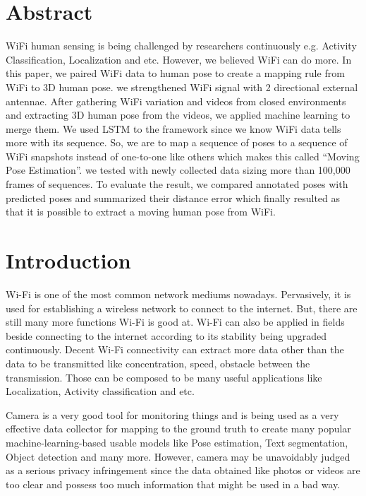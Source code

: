 \documentclass[10pt,letterpaper]{article}
\begin{document}
	\section*{Abstract}
	WiFi human sensing is being challenged by researchers continuously e.g. Activity Classification, Localization and etc. However, we believed WiFi can do more. In this paper, we paired WiFi data to human pose to create a mapping rule from WiFi to 3D human pose. we strengthened WiFi signal with 2 directional external antennae. After gathering WiFi variation and videos from closed environments and extracting 3D human pose from the videos, we applied machine learning to merge them. We used LSTM to the framework since we know WiFi data tells more with its sequence. So, we are to map a sequence of poses to a sequence of WiFi snapshots instead of one-to-one like others which makes this called ``Moving Pose Estimation''. we tested with newly collected data sizing more than 100,000 frames of sequences. To evaluate the result, we compared annotated poses with predicted poses and summarized their distance error which finally resulted as that it is possible to extract a moving human pose from WiFi.
	

	
	\linenumbers
	
	\section*{Introduction}
	Wi-Fi is one of the most common network mediums nowadays. Pervasively, it is used for establishing a wireless network to connect to the internet. But, there are still many more functions Wi-Fi is good at. Wi-Fi can also be applied in fields beside connecting to the internet according to its stability being upgraded continuously. Decent Wi-Fi connectivity can extract more data other than the data to be transmitted like concentration, speed, obstacle between the transmission. Those can be composed to be many useful applications like Localization, Activity classification and etc.
	
	
	Camera is a very good tool for monitoring things and is being used as a very effective data collector for mapping to the ground truth to create many popular machine-learning-based usable models like Pose estimation, Text segmentation, Object detection and many more. However, camera may be unavoidably judged as a serious privacy infringement since the data obtained like photos or videos are too clear and possess too much information that might be used in a bad way.
	
\end{document}

